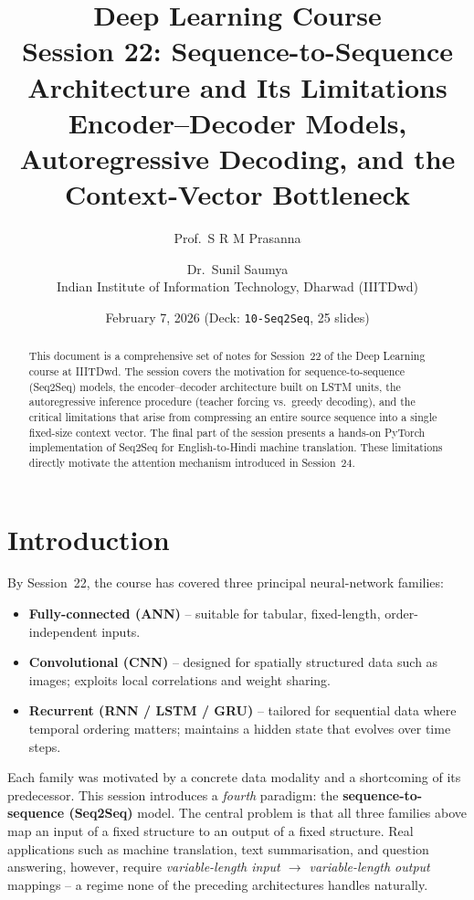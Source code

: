 \documentclass[12pt,a4paper]{article}
\title{%
  \vspace{-1cm}
  \Large\textbf{Deep Learning Course}\\[0.4em]
  \huge\textbf{Session 22: Sequence-to-Sequence Architecture and Its Limitations}\\[0.6em]
  \large Encoder--Decoder Models, Autoregressive Decoding, and the Context-Vector Bottleneck
}
\author{%
  Prof.\ S R M Prasanna \and Dr.\ Sunil Saumya\\[0.2em]
  \normalsize Indian Institute of Information Technology, Dharwad (IIITDwd)
}
\date{February 7, 2026 \quad (Deck: \texttt{10-Seq2Seq}, 25 slides)}
\begin{document}

\maketitle
\thispagestyle{fancy}

\begin{abstract}
This document is a comprehensive set of notes for Session~22 of the Deep Learning course at IIITDwd.
The session covers the motivation for sequence-to-sequence (Seq2Seq) models, the encoder--decoder
architecture built on LSTM units, the autoregressive inference procedure (teacher forcing vs.\ greedy
decoding), and the critical limitations that arise from compressing an entire source sequence into a
single fixed-size context vector. The final part of the session presents a hands-on PyTorch
implementation of Seq2Seq for English-to-Hindi machine translation.
These limitations directly motivate the attention mechanism introduced in Session~24.
\end{abstract}

\tableofcontents
\newpage

\section{Introduction}
\label{sec:introduction}

By Session~22, the course has covered three principal neural-network families:
\begin{itemize}[noitemsep]
  \item \textbf{Fully-connected (ANN)} -- suitable for tabular, fixed-length, order-independent inputs.
  \item \textbf{Convolutional (CNN)} -- designed for spatially structured data such as images; exploits
        local correlations and weight sharing.
  \item \textbf{Recurrent (RNN / LSTM / GRU)} -- tailored for sequential data where temporal ordering
        matters; maintains a hidden state that evolves over time steps.
\end{itemize}

Each family was motivated by a concrete data modality and a shortcoming of its predecessor. This
session introduces a \emph{fourth} paradigm: the \textbf{sequence-to-sequence (Seq2Seq)} model. The
central problem is that all three families above map an input of a fixed structure to an output of a
fixed structure. Real applications such as machine translation, text summarisation, and question
answering, however, require \emph{variable-length input $\to$ variable-length output} mappings -- a
regime none of the preceding architectures handles naturally.
\end{document}
